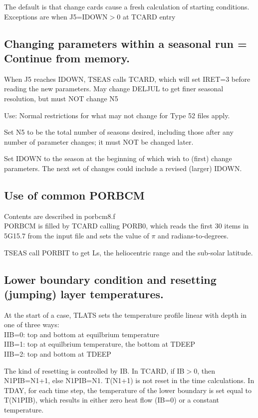 \documentclass{article}
\newcommand{\qi}{\\ \hspace*{2.em}}      %
\begin{document}
The default is that change cards cause a fresh calculation of starting
conditions. Exceptions are when J5=IDOWN$>0$ at TCARD entry

\subsection{Changing parameters within a seasonal run = Continue from memory.}%

When J5 reaches IDOWN, TSEAS calls TCARD, which will set IRET=3 before reading
the new parameters. May change DELJUL to get finer seasonal resolution, but must
NOT change N5

Use: Normal restrictions for what may not change for Type 52 files apply.

Set N5 to be the total number of seasons desired, including those
after any number of parameter changes; it must NOT be changed later.

Set IDOWN to the season at the beginning of which wish to (first) change
parameters. The next set of changes could include a revised (larger) IDOWN.


\subsection{Use of common PORBCM}%
Contents are described in porbcm8.f \\
PORBCM is filled by TCARD calling PORB0, which reads the first 30 items in 
5G15.7 from the input file and sets the value of $\pi$ and radians-to-degrees. 

TSEAS call PORBIT to get Ls, the heliocentric range and the sub-solar latitude.

\subsection{Lower boundary condition and resetting (jumping) layer temperatures.} %
At the start of a case, TLATS sets the temperature profile linear with depth
in one of three ways:
\qi IIB=0: top and bottom at equilbrium temperature
\qi IIB=1: top at equilbrium temperature, the bottom at TDEEP
\qi IIB=2: top and bottom at TDEEP

The kind of resetting is controlled by IB. In TCARD, if IB$>$0, then N1PIB=N1+1,
else N1PIB=N1.  T(N1+1) is not reset in the time calculations. In TDAY, for each
time step, the temperature of the lower boundary is set equal to T(N1PIB), which
results in either zero heat flow (IB=0) or a constant temperature.
\end{document}
